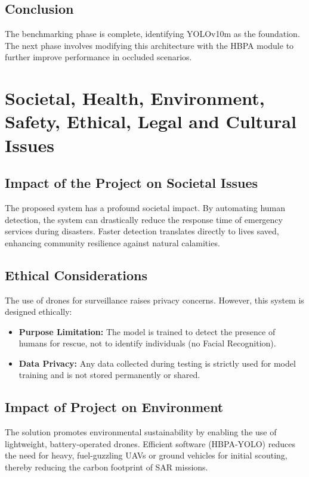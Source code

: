 \documentclass[12pt, a4paper]{report}
\begin{document}
\section{Conclusion}
The benchmarking phase is complete, identifying YOLOv10m as the foundation. The next phase involves modifying this architecture with the HBPA module to further improve performance in occluded scenarios.

\chapter{Societal, Health, Environment, Safety, Ethical, Legal and Cultural Issues}

\section{Impact of the Project on Societal Issues}
The proposed system has a profound societal impact. By automating human detection, the system can drastically reduce the response time of emergency services during disasters. Faster detection translates directly to lives saved, enhancing community resilience against natural calamities.

\section{Ethical Considerations}
The use of drones for surveillance raises privacy concerns. However, this system is designed ethically:
\begin{itemize}
    \item \textbf{Purpose Limitation:} The model is trained to detect the presence of humans for rescue, not to identify individuals (no Facial Recognition).
    \item \textbf{Data Privacy:} Any data collected during testing is strictly used for model training and is not stored permanently or shared.
\end{itemize}

\section{Impact of Project on Environment}
The solution promotes environmental sustainability by enabling the use of lightweight, battery-operated drones. Efficient software (HBPA-YOLO) reduces the need for heavy, fuel-guzzling UAVs or ground vehicles for initial scouting, thereby reducing the carbon footprint of SAR missions.
\end{document}
